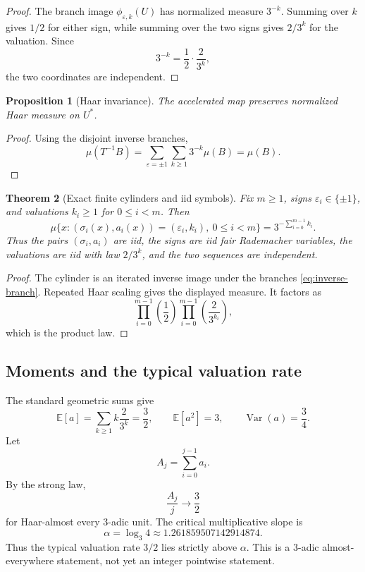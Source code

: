\documentclass[11pt]{article}
\newtheorem{theorem}{Theorem}[section]
\newtheorem{proposition}[theorem]{Proposition}
\theoremstyle{definition}
\theoremstyle{remark}
\newcommand{\E}{\mathbb E}
\begin{document}
\begin{proof}
The branch image $\phi_{\varepsilon,k}(U)$ has normalized measure $3^{-k}$.  Summing over $k$ gives $1/2$ for either sign, while summing over the two signs gives $2/3^k$ for the valuation.  Since
\[
3^{-k}=\frac12\cdot\frac{2}{3^k},
\]
the two coordinates are independent.
\end{proof}

\begin{proposition}[Haar invariance]
The accelerated map preserves normalized Haar measure on $U^\ast$.
\end{proposition}

\begin{proof}
Using the disjoint inverse branches,
\[
\mu(T^{-1}B)
=
\sum_{\varepsilon=\pm1}\sum_{k\ge1}3^{-k}\mu(B)
=\mu(B).
\]
\end{proof}

\begin{theorem}[Exact finite cylinders and iid symbols]
Fix $m\ge1$, signs $\varepsilon_i\in\{\pm1\}$, and valuations $k_i\ge1$ for $0\le i<m$.  Then
\[
\mu\{x:(\sigma_i(x),a_i(x))=(\varepsilon_i,k_i),\ 0\le i<m\}
=3^{-\sum_{i=0}^{m-1}k_i}.
\]
Thus the pairs $(\sigma_i,a_i)$ are iid, the signs are iid fair Rademacher variables, the valuations are iid with law $2/3^k$, and the two sequences are independent.
\end{theorem}

\begin{proof}
The cylinder is an iterated inverse image under the branches \eqref{eq:inverse-branch}.  Repeated Haar scaling gives the displayed measure.  It factors as
\[
\prod_{i=0}^{m-1}\left(\frac12\right)
\prod_{i=0}^{m-1}\left(\frac{2}{3^{k_i}}\right),
\]
which is the product law.
\end{proof}

\subsection{Moments and the typical valuation rate}

The standard geometric sums give
\[
\E[a]=\sum_{k\ge1}k\frac{2}{3^k}=\frac32,
\qquad
\E[a^2]=3,
\qquad
\operatorname{Var}(a)=\frac34.
\]
Let
\[
A_j=\sum_{i=0}^{j-1}a_i.
\]
By the strong law,
\[
\frac{A_j}{j}\longrightarrow\frac32
\]
for Haar-almost every $3$-adic unit.  The critical multiplicative slope is
\begin{equation}
\alpha=\log_3 4\approx1.261859507142914874.
\label{eq:alpha}
\end{equation}
Thus the typical valuation rate $3/2$ lies strictly above $\alpha$.  This is a $3$-adic almost-everywhere statement, not yet an integer pointwise statement.
\end{document}
